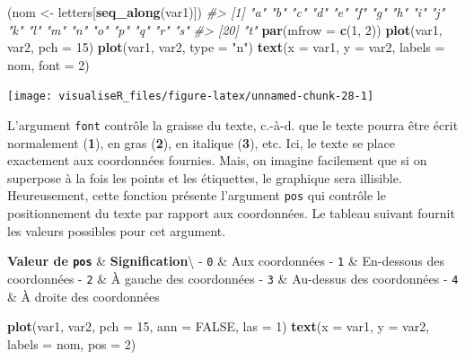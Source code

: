 \documentclass[]{article}
\newenvironment{Shaded}{\begin{snugshade}}{\end{snugshade}}
\newcommand{\CommentTok}[1]{\textcolor[rgb]{0.56,0.35,0.01}{\textit{#1}}}
\newcommand{\DataTypeTok}[1]{\textcolor[rgb]{0.13,0.29,0.53}{#1}}
\newcommand{\DecValTok}[1]{\textcolor[rgb]{0.00,0.00,0.81}{#1}}
\newcommand{\KeywordTok}[1]{\textcolor[rgb]{0.13,0.29,0.53}{\textbf{#1}}}
\newcommand{\NormalTok}[1]{#1}
\newcommand{\OtherTok}[1]{\textcolor[rgb]{0.56,0.35,0.01}{#1}}
\newcommand{\StringTok}[1]{\textcolor[rgb]{0.31,0.60,0.02}{#1}}
\begin{document}
\begin{Shaded}
\begin{Highlighting}[]
\NormalTok{(nom <-}\StringTok{ }\NormalTok{letters[}\KeywordTok{seq_along}\NormalTok{(var1)])}
\CommentTok{#>  [1] "a" "b" "c" "d" "e" "f" "g" "h" "i" "j" "k" "l" "m" "n" "o" "p" "q" "r" "s"}
\CommentTok{#> [20] "t"}
\KeywordTok{par}\NormalTok{(}\DataTypeTok{mfrow =} \KeywordTok{c}\NormalTok{(}\DecValTok{1}\NormalTok{, }\DecValTok{2}\NormalTok{))}
\KeywordTok{plot}\NormalTok{(var1, var2, }\DataTypeTok{pch =} \DecValTok{15}\NormalTok{)}
\KeywordTok{plot}\NormalTok{(var1, var2, }\DataTypeTok{type =} \StringTok{"n"}\NormalTok{)}
\KeywordTok{text}\NormalTok{(}\DataTypeTok{x =}\NormalTok{ var1, }\DataTypeTok{y =}\NormalTok{ var2, }\DataTypeTok{labels =}\NormalTok{ nom, }\DataTypeTok{font =} \DecValTok{2}\NormalTok{)}
\end{Highlighting}
\end{Shaded}

\begin{center}\texttt{[image: visualiseR\_files/figure-latex/unnamed-chunk-28-1]} \end{center}

L'argument \texttt{font} contrôle la graisse du texte, c.-à-d. que le texte pourra être écrit normalement (\textbf{1}), en gras (\textbf{2}), en italique (\textbf{3}), etc. Ici, le texte se place exactement aux coordonnées fournies. Mais, on imagine facilement que si on superpose à la fois les points et les étiquettes, le graphique sera illisible. Heureusement, cette fonction présente l'argument \texttt{pos} qui contrôle le positionnement du texte par rapport aux coordonnées. Le tableau suivant fournit les valeurs possibles pour cet argument.

\textbf{Valeur de \texttt{pos}} \& \textbf{Signification}\textbackslash{}
- \texttt{0} \& Aux coordonnées
- \texttt{1} \& En-dessous des coordonnées
- \texttt{2} \& À gauche des coordonnées
- \texttt{3} \& Au-dessus des coordonnées
- \texttt{4} \& À droite des coordonnées

\begin{Shaded}
\begin{Highlighting}[]
\KeywordTok{plot}\NormalTok{(var1, var2, }\DataTypeTok{pch =} \DecValTok{15}\NormalTok{, }\DataTypeTok{ann =} \OtherTok{FALSE}\NormalTok{, }\DataTypeTok{las =} \DecValTok{1}\NormalTok{)}
\KeywordTok{text}\NormalTok{(}\DataTypeTok{x =}\NormalTok{ var1, }\DataTypeTok{y =}\NormalTok{ var2, }\DataTypeTok{labels =}\NormalTok{ nom, }\DataTypeTok{pos =} \DecValTok{2}\NormalTok{)}
\end{Highlighting}
\end{Shaded}
\end{document}
